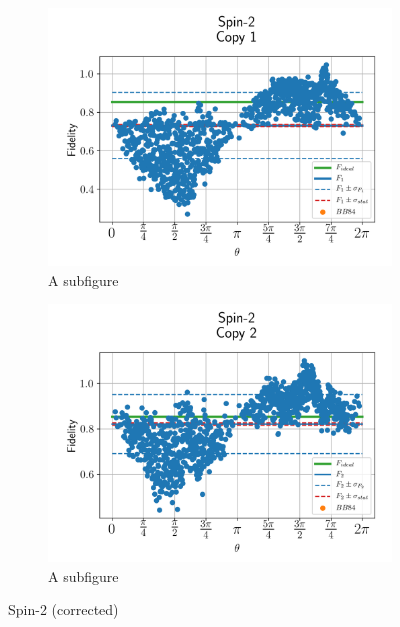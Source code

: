 \begin{figure}[H]
    \centering
    \begin{subfigure}{.5\textwidth}
      \centering
      \includegraphics[width=\textwidth]{Figures/Economical/Spin2/FullSphere/results_spin2_corrected_copy1.png}
      \caption{A subfigure}
      \label{fig:ec_pin2_sphere_1_corrected}
    \end{subfigure}%
    \begin{subfigure}{.5\textwidth}
      \centering
      \includegraphics[width=\textwidth]{Figures/Economical/Spin2/FullSphere/results_spin2_corrected_copy2.png}
      \caption{A subfigure}
      \label{fig:ec_spin2_sphere_2_corrected}
    \end{subfigure}
    \caption{Spin-2 (corrected)}
    \label{fig:ec_spin2_sphere_corrected}
\end{figure}

